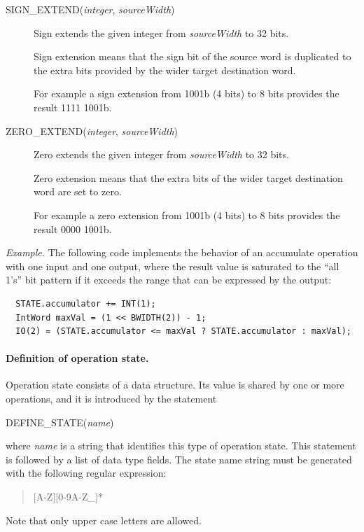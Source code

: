 \documentclass[a4paper,twoside]{tceusermanual}
\begin{document}
\begin{description}
\item[SIGN\_EXTEND(\emph{integer}, \emph{sourceWidth})]%
  Sign extends the given integer from \emph{sourceWidth} to 32 bits.
 
  Sign extension means that the sign bit of the source word is duplicated
  to the extra bits provided by the wider target destination word.

  For example a sign extension from 1001b (4 bits) to 8 bits provides
  the result 1111 1001b.

\item[ZERO\_EXTEND(\emph{integer}, \emph{sourceWidth})]%
  Zero extends the given integer from \emph{sourceWidth} to 32 bits.

  Zero extension means that the extra bits of the wider target destination
  word are set to zero. 

  For example a zero extension from 1001b (4 bits) to 8 bits provides
  the result 0000 1001b.

\end{description}

\emph{Example.} The following code implements the behavior of an accumulate
operation with one input and one output, where the result value is saturated
to the ``all 1's'' bit pattern if it exceeds the range that can be expressed
by the output:
\begin{verbatim}
  STATE.accumulator += INT(1);
  IntWord maxVal = (1 << BWIDTH(2)) - 1;
  IO(2) = (STATE.accumulator <= maxVal ? STATE.accumulator : maxVal);
\end{verbatim}

\paragraph{Definition of operation state.}
Operation state consists of a data structure.  Its value
is shared by one or more operations, and it is introduced by the statement
\begin{description}
\item[DEFINE\_STATE(\emph{name})]
\end{description}
where \emph{name} is a string that identifies this type of operation state.
This statement is followed by a list of data type fields. The state name
string must be generated with the following regular expression:
\begin{quote}
  [A-Z][0-9A-Z\_]*
\end{quote}
Note that only upper case letters are allowed.
\end{document}
